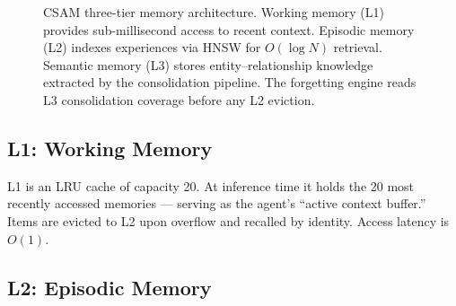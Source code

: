 \documentclass{article}
\begin{document}
\begin{figure}[h]
\centering
{}
\caption{CSAM three-tier memory architecture.  Working memory (L1) provides
  sub-millisecond access to recent context.  Episodic memory (L2) indexes
  experiences via HNSW for $O(\log N)$ retrieval.  Semantic memory (L3)
  stores entity–relationship knowledge extracted by the consolidation pipeline.
  The forgetting engine reads L3 consolidation coverage before any L2 eviction.}
\label{fig:architecture}
\end{figure}

\subsection{L1: Working Memory}

L1 is an LRU cache of capacity 20.  At inference time it holds the 20 most
recently accessed memories — serving as the agent's ``active context buffer.''
Items are evicted to L2 upon overflow and recalled by identity.  Access
latency is $O(1)$.

\subsection{L2: Episodic Memory}
\end{document}
